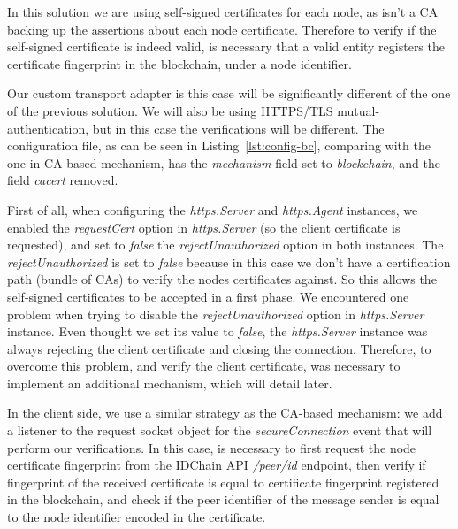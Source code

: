 In this solution we are using self-signed certificates for each node, as isn't a CA backing up the assertions about each node certificate.
Therefore to verify if the self-signed certificate is indeed valid, is necessary that a valid entity registers the certificate fingerprint in the blockchain, under a node identifier.

Our custom transport adapter is this case will be significantly different of the one of the previous solution.
We will also be using HTTPS/TLS mutual-authentication, but in this case the verifications will be different.
The configuration file, as can be seen in Listing~\ref{lst:config-bc}, comparing with the one in CA-based mechanism, has the \textit{mechanism} field set to \textit{blockchain}, and the field \textit{cacert} removed.



First of all, when configuring the \textit{https.Server} and \textit{https.Agent} instances, we enabled the \textit{requestCert} option in \textit{https.Server} (so the client certificate is requested), and set to \textit{false} the \textit{rejectUnauthorized} option in both instances.
The \textit{rejectUnauthorized} is set to \textit{false} because in this case we don't have a certification path (bundle of CAs) to verify the nodes certificates against.
So this allows the self-signed certificates to be accepted in a first phase.
We encountered one problem when trying to disable the \textit{rejectUnauthorized} option in \textit{https.Server} instance.
Even thought we set its value to \textit{false}, the \textit{https.Server} instance was always rejecting the client certificate and closing the connection.
Therefore, to overcome this problem, and verify the client certificate, was necessary to implement an additional mechanism, which will detail later.

In the client side, we use a similar strategy as the CA-based mechanism: we add a listener to the request socket object for the \textit{secureConnection} event that will perform our verifications.
In this case, is necessary to first request the node certificate fingerprint from the IDChain API \textit{/peer/id} endpoint, then verify if fingerprint of the received certificate is equal to certificate fingerprint registered in the blockchain, and check if the peer identifier of the message sender is equal to the node identifier encoded in the certificate.

